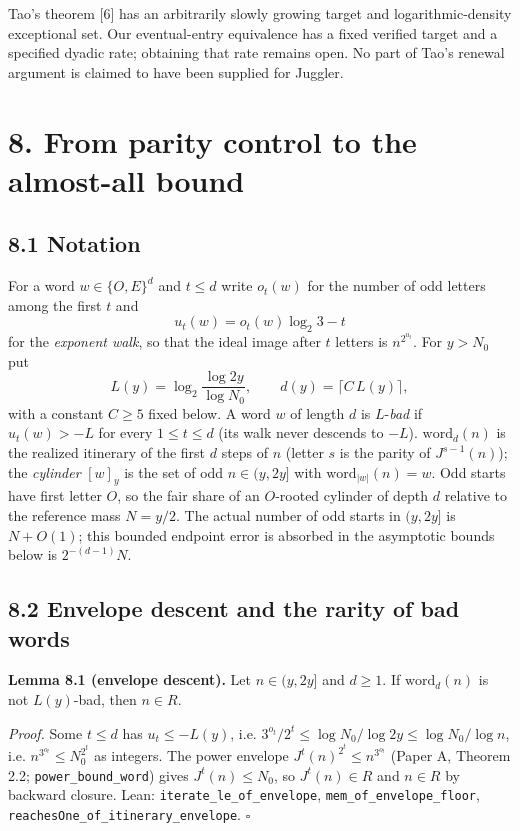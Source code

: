 \documentclass[11pt,a4paper]{article}
\begin{document}
Tao's theorem {[}6{]} has an arbitrarily slowly growing target and
logarithmic-density exceptional set. Our eventual-entry equivalence has
a fixed verified target and a specified dyadic rate; obtaining that rate
remains open. No part of Tao's renewal argument is claimed to have been
supplied for Juggler.

\section{8. From parity control to the almost-all
bound}\label{from-parity-control-to-the-almost-all-bound}

\subsection{8.1 Notation}\label{notation}

For a word \(w\in\{O,E\}^d\) and \(t\le d\) write \(o_t(w)\) for the
number of odd letters among the first \(t\) and \[
u_t(w)=o_t(w)\log_2 3-t
\] for the \emph{exponent walk}, so that the ideal image after \(t\)
letters is \(n^{2^{u_t}}\). For \(y>N_0\) put \[
L(y)=\log_2\frac{\log 2y}{\log N_0},\qquad d(y)=\lceil C\,L(y)\rceil ,
\] with a constant \(C\ge 5\) fixed below. A word \(w\) of length \(d\)
is \(L\)-\emph{bad} if \(u_t(w)>-L\) for every \(1\le t\le d\) (its walk
never descends to \(-L\)). \(\mathrm{word}_d(n)\) is the realized
itinerary of the first \(d\) steps of \(n\) (letter \(s\) is the parity
of \(J^{s-1}(n)\)); the \emph{cylinder} \([w]_y\) is the set of odd
\(n\in(y,2y]\) with \(\mathrm{word}_{|w|}(n)=w\). Odd starts have first
letter \(O\), so the fair share of an \(O\)-rooted cylinder of depth
\(d\) relative to the reference mass \(N=y/2\). The actual number of odd
starts in \((y,2y]\) is \(N+O(1)\); this bounded endpoint error is
absorbed in the asymptotic bounds below is \(2^{-(d-1)}N\).

\subsection{8.2 Envelope descent and the rarity of bad
words}\label{envelope-descent-and-the-rarity-of-bad-words}

\textbf{Lemma 8.1 (envelope descent).} Let \(n\in(y,2y]\) and
\(d\ge 1\). If \(\mathrm{word}_d(n)\) is not \(L(y)\)-bad, then
\(n\in R\).

\emph{Proof.} Some \(t\le d\) has \(u_t\le -L(y)\), i.e.
\(3^{o_t}/2^t\le\log N_0/\log 2y\le\log N_0/\log n\), i.e.
\(n^{3^{o_t}}\le N_0^{2^t}\) as integers. The power envelope
\(J^t(n)^{2^t}\le n^{3^{o_t}}\) (Paper A, Theorem 2.2;
\texttt{\nolinkurl{power_bound_word}}) gives \(J^t(n)\le N_0\), so
\(J^t(n)\in R\) and \(n\in R\) by backward closure. Lean:
\texttt{\nolinkurl{iterate_le_of_envelope}},
\texttt{\nolinkurl{mem_of_envelope_floor}},
\texttt{\nolinkurl{reachesOne_of_itinerary_envelope}}. \(\square\)
\end{document}
